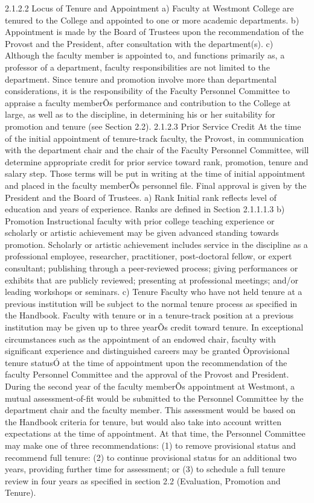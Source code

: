 \documentclass[letterpaper, 11pt]{article}
\begin{document}
2.1.2.2 Locus of Tenure and Appointment
a) Faculty at Westmont College are tenured to the College and appointed to one or more academic departments.
b) Appointment is made by the Board of Trustees upon the recommendation of the Provost and the President, after consultation with the department(s).
c) Although the faculty member is appointed to, and functions primarily as, a professor of a department, faculty responsibilities are not limited to the department.  Since tenure and promotion involve more than departmental considerations, it is the responsibility of the Faculty Personnel Committee to appraise a faculty memberÕs performance and contribution to the College at large, as well as to the discipline, in determining his or her suitability for promotion and tenure (see Section 2.2).
2.1.2.3 Prior Service Credit
At the time of the initial appointment of tenure-track faculty, the Provost, in communication with the department chair and the chair of the Faculty Personnel Committee, will determine appropriate credit for prior service toward rank, promotion, tenure and salary step.  Those terms will be put in writing at the time of initial appointment and placed in the faculty memberÕs personnel file.  Final approval is given by the President and the Board of Trustees.
a) Rank Initial rank reflects level of education and years of experience.  Ranks are defined in Section 2.1.1.1.3
b) Promotion Instructional faculty with prior college teaching experience or scholarly or artistic achievement may be given advanced standing towards promotion.  Scholarly or artistic achievement includes service in the discipline as a professional employee, researcher, practitioner, post-doctoral fellow, or expert consultant; publishing through a peer-reviewed process; giving performances or exhibits that are publicly reviewed; presenting at professional meetings; and/or leading workshops or seminars.
c) Tenure Faculty who have not held tenure at a previous institution will be subject to the normal tenure process as specified in the Handbook.  Faculty with tenure or in a tenure-track position at a previous institution may be given up to three yearÕs credit toward tenure.
       In exceptional circumstances such as the appointment of an endowed chair, faculty with significant experience and distinguished careers may be granted Òprovisional tenure statusÓ at the time of appointment upon the recommendation of the faculty Personnel Committee and the approval of the Provost and President.  During the second year of the faculty memberÕs appointment at Westmont, a mutual assessment-of-fit would be submitted to the Personnel Committee by the department chair and the faculty member.  This assessment would be based on the Handbook criteria for tenure, but would also take into account written expectations at the time of appointment.  At that time, the Personnel Committee may make one of three recommendations: (1) to remove provisional status and recommend full tenure: (2) to continue provisional status for an additional two years, providing further time for assessment; or (3) to schedule a full tenure review in four years as specified in section 2.2 (Evaluation, Promotion and Tenure).
\end{document}
